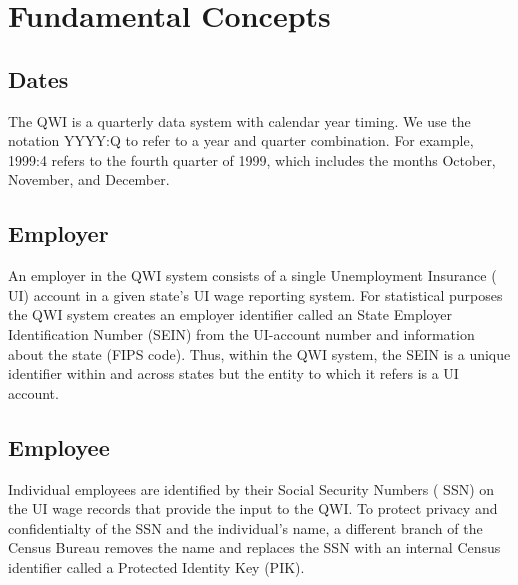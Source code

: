                       


%
%



\section{Fundamental Concepts}

\subsection{Dates}


The QWI is a quarterly data system with calendar year timing.  We use the
notation YYYY:Q to refer to a year and quarter combination. For example,
1999:4 refers to the fourth quarter of 1999, which includes the months
October, November, and December.

\subsection{Employer}


An employer in the QWI system consists of a single Unemployment Insurance (%
UI) account in a given state's UI wage reporting system.  For
statistical purposes the QWI system creates an employer identifier called
an State Employer Identification Number (SEIN) from the
UI-account number and information about the state (FIPS code). 
Thus, within the QWI system, the SEIN is a unique identifier within and
across states but the entity to which it refers is a UI account.

\subsection{Employee}

Individual employees are identified by their Social Security Numbers (%
SSN) on the UI wage records that provide the input to the QWI. To
protect privacy and confidentialty of the SSN and the individual's
name, a different branch of the Census Bureau removes the name and replaces
the SSN with an internal Census identifier called a Protected
Identity Key (PIK).

